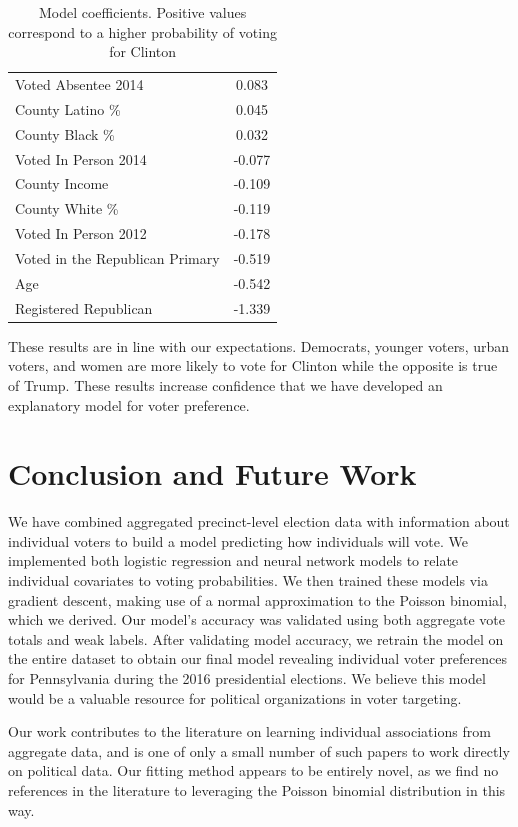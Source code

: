 \documentclass[10pt, letterpaper]{article}
\begin{document}
\begin{multicols}{2}
\begin{table}[H]
\begin{tabular}{|l|c|}
Voted Absentee 2014 & 0.083 \\
County Latino \% & 0.045  \\
County Black \% & 0.032  \\
Voted In Person 2014 & -0.077 \\ 
County Income & -0.109  \\
County White \% & -0.119  \\
Voted In Person 2012 & -0.178 \\
Voted in the Republican Primary & -0.519  \\
Age & -0.542  \\
Registered Republican & -1.339  \\
\hline
\end{tabular}
\label{table:coeff}
\caption{Model coefficients. Positive values correspond to a higher probability of voting for Clinton}
\end{table}
These results are in line with our expectations. Democrats, younger voters, urban voters, and women are more likely to vote for Clinton while the opposite is true of Trump. These results increase confidence that we have developed an explanatory model for voter preference. 

\section*{Conclusion and Future Work}

We have combined aggregated precinct-level election data with information about individual voters to build a model predicting how individuals will vote. We implemented both logistic regression and neural network models to relate individual covariates to voting probabilities. We then trained these models via gradient descent, making use of a normal approximation to the Poisson binomial, which we derived. Our model's accuracy was validated using both aggregate vote totals and weak labels. After validating model accuracy, we retrain the model on the entire dataset to obtain our final model revealing individual voter preferences for Pennsylvania during the 2016 presidential elections. We believe this model would be a valuable resource for political organizations in voter targeting. 

Our work contributes to the literature on learning individual associations from aggregate data, and is one of only a small number of such papers to work directly on political data. Our fitting method appears to be entirely novel, as we find no references in the literature to leveraging the Poisson binomial distribution in this way. 


\end{multicols}
\end{document}
